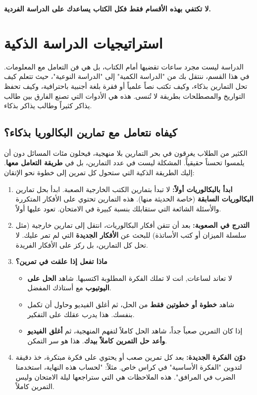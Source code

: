 \documentclass[12pt,a4paper]{book}
\newcommand{\importantAr}[1]{%
	\begin{important}
		\bfseries #1
	\end{important}
}
\begin{document}
	\importantAr{لا تكتفي بهذه الأقسام فقط فكل الكتاب يساعدك على الدراسة الفردية.}
	
	
	\section{استراتيجيات الدراسة الذكية}
	
	الدراسة ليست مجرد ساعات تقضيها أمام الكتاب، بل هي فن التعامل مع المعلومات. في هذا القسم، ننتقل بك من "الدراسة الكمية" إلى "الدراسة النوعية"، حيث تتعلم كيف تحل التمارين بذكاء، وكيف تكتب نصاً علمياً أو فقرة بلغة أجنبية باحترافية، وكيف تحفظ التواريخ والمصطلحات بطريقة لا تُنسى. هذه هي الأدوات التي تصنع الفارق بين طالب يذاكر كثيراً وطالب يذاكر بذكاء.
	
	\subsection{كيفاه نتعامل مع تمارين البكالوريا بذكاء؟}
	\label{sec:smart-exercise-solving}
	
	الكثير من الطلاب يغرقون في بحر التمارين بلا منهجية، فيحلون مئات المسائل دون أن يلمسوا تحسناً حقيقياً. المشكلة ليست في عدد التمارين، بل في \textbf{طريقة التعامل معها}. إليك الطريقة الذكية التي ستحول كل تمرين إلى خطوة نحو الإتقان:
	
	\begin{enumerate}
		\item \textbf{ابدأ بالبكالوريات أولاً:} لا تبدأ بتمارين الكتب الخارجية الصعبة. ابدأ بحل تمارين \textbf{البكالوريات السابقة} (خاصة الحديثة منها). هذه التمارين تحتوي على الأفكار المتكررة والأسئلة الشائعة التي ستقابلك بنسبة كبيرة في الامتحان. تعود عليها أولاً.
		
		\item \textbf{التدرج في الصعوبة:} بعد أن تتقن أفكار البكالوريات، انتقل إلى تمارين خارجية (مثل سلسلة الميزان أو كتب الأساتذة) للبحث عن \textbf{الأفكار الجديدة} التي لم تمر عليك. لا تحل كل التمارين، بل ركز على الأفكار الفريدة.
		
		\item \textbf{ماذا تفعل إذا علقت في تمرين؟}
		\begin{itemize}
			\item لا تعاند لساعات, انت لا تملك الفكرة المطلوبة اكتسبها. شاهد \textbf{الحل على اليوتيوب} مع أستاذك المفضل.
			\item شاهد \textbf{خطوة أو خطوتين فقط} من الحل، ثم أغلق الفيديو وحاول أن تكمل بنفسك. هذا يدرب عقلك على التفكير.
			\item إذا كان التمرين صعباً جداً، شاهد الحل كاملاً لتفهم المنهجية، ثم \textbf{أغلق الفيديو وأعد حل التمرين كاملاً بيدك}. هذا هو سر التمكن.
		\end{itemize}
		
		\item \textbf{دوّن الفكرة الجديدة:} بعد كل تمرين صعب أو يحتوي على فكرة مبتكرة، خذ دقيقة لتدوين "الفكرة الأساسية" في كراس خاص. مثلاً: "لحساب هذه النهاية، استخدمنا الضرب في المرافق". هذه الملاحظات هي التي ستراجعها ليلة الامتحان وليس التمرين كاملاً.
	\end{enumerate}
	
\end{document}

